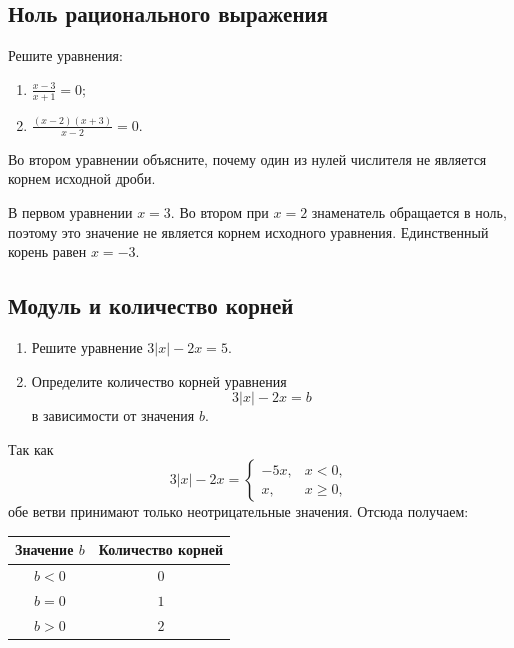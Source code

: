 \subsection{Ноль рационального выражения}

\begin{trainingtask}
  Решите уравнения:
  \begin{enumerate}
    \item \(\displaystyle \frac{x-3}{x+1}=0;\)
    \item \(\displaystyle \frac{(x-2)(x+3)}{x-2}=0.\)
  \end{enumerate}
  Во втором уравнении объясните, почему один из нулей числителя не является
  корнем исходной дроби.
\end{trainingtask}

\begin{notebox}[Проверка]
  В первом уравнении \(x=3\). Во втором при \(x=2\) знаменатель обращается
  в ноль, поэтому это значение не является корнем исходного уравнения.
  Единственный корень равен \(x=-3\).
\end{notebox}

\subsection{Модуль и количество корней}

\begin{trainingtask}
  \begin{enumerate}
    \item Решите уравнение \(3|x|-2x=5\).
    \item Определите количество корней уравнения
      \[
        3|x|-2x=b
      \]
      в зависимости от значения \(b\).
  \end{enumerate}
\end{trainingtask}

Так как
\[
  3|x|-2x=
  \begin{cases}
    -5x, & x<0,\\
    x, & x\ge 0,
  \end{cases}
\]
обе ветви принимают только неотрицательные значения. Отсюда получаем:

\begin{center}
  \renewcommand{\arraystretch}{1.28}
  \begin{tabular}{cc}
    \toprule
    \rowcolor{TableHeader}
    Значение \(b\) & Количество корней \\
    \midrule
    \(b<0\) & \(0\) \\
    \(b=0\) & \(1\) \\
    \(b>0\) & \(2\) \\
    \bottomrule
  \end{tabular}
\end{center}

